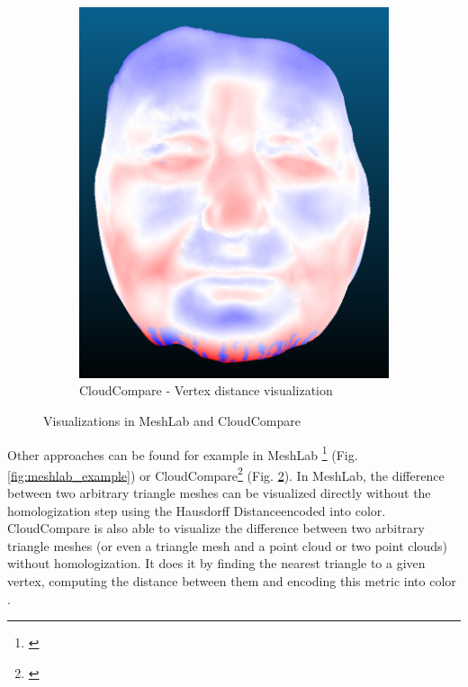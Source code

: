 \begin{figure}[h]
\begin{subfigure}{0.3\textwidth}
	\includegraphics[width=\textwidth]{./img/cloudcompare-example01.PNG}
    \caption[CloudCompare - Vertex distance visualization]{CloudCompare - Vertex distance visualization}
    \label{fig:cloudcompare_example}
	\end{subfigure}
\caption{Visualizations in MeshLab and CloudCompare}
\end{figure}

Other approaches can be found for example in MeshLab \footnote{\citet{MeshLab}} (Fig. \ref{fig:meshlab_example}) or CloudCompare\footnote{\citet{CloudCmp}} (Fig. \ref{fig:cloudcompare_example}). In MeshLab, the difference between two arbitrary triangle meshes can be visualized directly without the homologization step using the Hausdorff Distance\footnotemark encoded into color. CloudCompare is also able to visualize the difference between two arbitrary triangle meshes (or even a triangle mesh and a point cloud or two point clouds) without homologization. It does it by finding the nearest triangle to a given vertex, computing the distance between them and encoding this metric into color \citep{CloudCmpDistance}.

